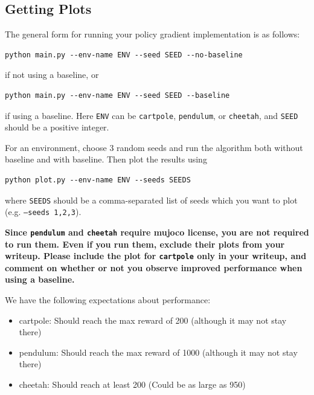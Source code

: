 \documentclass[11pt]{article}
\theoremstyle{case}
\begin{document}
\subsection{Getting Plots}
The general form for running your policy gradient implementation is as follows:
\begin{verbatim}
python main.py --env-name ENV --seed SEED --no-baseline
\end{verbatim}
if not using a baseline, or
\begin{verbatim}
python main.py --env-name ENV --seed SEED --baseline
\end{verbatim}
if using a baseline. Here \texttt{ENV} can be \texttt{cartpole}, \texttt{pendulum}, or \texttt{cheetah}, and \texttt{SEED} should be a positive integer.

For an environment, choose 3 random seeds and run the algorithm both without baseline and with baseline. Then plot the results using
\begin{verbatim}
python plot.py --env-name ENV --seeds SEEDS
\end{verbatim}
where \texttt{SEEDS} should be a comma-separated list of seeds which you want to plot (e.g. \texttt{--seeds 1,2,3}).

\textbf{ Since \texttt{pendulum} and \texttt{cheetah} require mujoco license, you are not required to run them. Even if you run them, exclude their plots from your writeup. Please include the plot for \texttt{cartpole} only in your writeup, and comment on whether or not you observe improved performance when using a baseline.}

We have the following expectations about performance:
\begin{itemize}
    \item cartpole: Should reach the max reward of 200 (although it may not stay there)
    \item pendulum: Should reach the max reward of 1000 (although it may not stay there)
    \item cheetah: Should reach at least 200 (Could be as large as 950)
\end{itemize}
\end{document}
